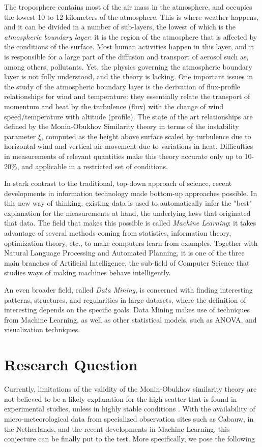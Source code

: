 \documentclass[12pt]{book}
\begin{document}
The troposphere contains most of the air mass in the atmosphere, and occupies the lowest 10 to 12 kilometers of the atmosphere. This is where weather happens, and it can be divided in a number of sub-layers, the lowest of which is the \emph{atmospheric boundary layer}: it is the region of the atmosphere that is affected by the conditions of the surface. Most human activities happen in this layer, and it is responsible for a large part of the diffusion and transport of aerosol such as, among others, pollutants. Yet, the physics governing the atmospheric boundary layer is not fully understood, and the theory is lacking. One important issues in the study of the atmospheric boundary layer is the derivation of flux-profile relationships for wind and temperature: they essentially relate the transport of momentum and heat by the turbulence (flux) with the change of wind speed/temperature with altitude (profile). The state of the art relationships are defined by the Monin-Obukhov Similarity theory in terms of the instability parameter $\xi$, computed as the height above surface scaled by turbulence due to horizontal wind and vertical air movement due to variations in heat. Difficulties in measurements of relevant quantities make this theory accurate only up to 10-20\%, and applicable in a restricted set of conditions.

In stark contrast to the traditional, top-down approach of science, recent developments in information technology made bottom-up approaches possible. In this new way of thinking, existing data is used to automatically infer the "best" explanation for the measurements at hand, the underlying laws that originated that data. The field that makes this possible is called \emph{Machine Learning}: it takes advantage of several methods coming from statistics, information theory, optimization theory, etc., to make computers learn from examples. Together with Natural Language Processing and Automated Planning, it is one of the three main branches of Artificial Intelligence, the sub-field of Computer Science that studies ways of making machines behave intelligently.

An even broader field, called \emph{Data Mining}, is concerned with finding interesting patterns, structures, and regularities in large datasets, where the definition of interesting depends on the specific goals. Data Mining makes use of techniques from Machine Learning, as well as other statistical models, such as ANOVA, and visualization techniques.

\section{Research Question}
\label{sec:research_question}
Currently, limitations of the validity of the Monin-Obukhov similarity theory are not believed to be a likely explanation for the high scatter that is found in experimental studies, unless in highly stable conditions \citep{basicatm}. With the availability of micro-meteorological data from specialized observation sites such as Cabauw, in the Netherlands, and the recent developments in Machine Learning, this conjecture can be finally put to the test. More specifically, we pose the following \\
\end{document}
